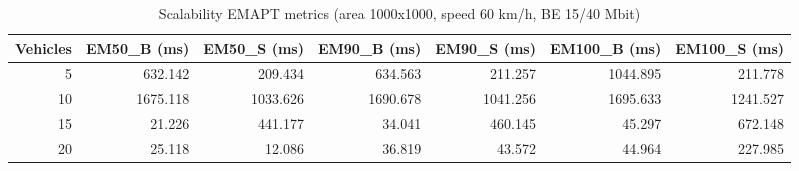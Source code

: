 \begin{table}[t]
\caption{Scalability EMAPT metrics (area 1000x1000, speed 60 km/h, BE 15/40 Mbit)}
\label{tab:scalability-emapt}
\centering
\begin{tabular}{r r r r r r r}
\hline
Vehicles & EM50\_B (ms) & EM50\_S (ms) & EM90\_B (ms) & EM90\_S (ms) & EM100\_B (ms) & EM100\_S (ms) \\
\hline
5 & 632.142 & 209.434 & 634.563 & 211.257 & 1044.895 & 211.778 \\
10 & 1675.118 & 1033.626 & 1690.678 & 1041.256 & 1695.633 & 1241.527 \\
15 & 21.226 & 441.177 & 34.041 & 460.145 & 45.297 & 672.148 \\
20 & 25.118 & 12.086 & 36.819 & 43.572 & 44.964 & 227.985 \\
\hline
\end{tabular}
\end{table}
